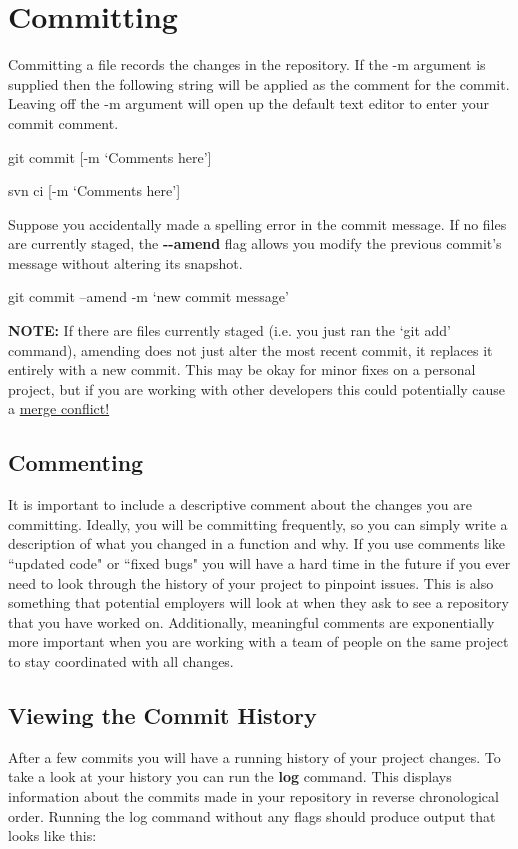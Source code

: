 \documentclass[oneside]{book}
\begin{document}
\newpage
\section{Committing}
Committing a file records the changes in the repository. If the -m argument is supplied then the following string will be applied as the comment for the commit. Leaving off the -m argument will open up the default text editor to enter your commit comment.
    \begin{gitcode}
    git commit [-m `Comments here']
    \end{gitcode}
    \begin{svncode}
    svn ci [-m `Comments here']
    \end{svncode}
    
Suppose you accidentally made a spelling error in the commit message. If no files are currently staged, the \textbf{-{}-amend} flag allows you modify the previous commit's message without altering its snapshot. 

    \begin{gitcode}
    git commit --amend -m `new commit message'
    \end{gitcode}

\textbf{NOTE:} If there are files currently staged (i.e. you just ran the `git add' command), amending does not just alter the most recent commit, it replaces it entirely with a new commit. This may be okay for minor fixes on a personal project, but if you are working with other developers this could potentially cause a \hyperref[sec:conflict-resolution]{merge conflict!}
    
\subsection{Commenting}
It is important to include a descriptive comment about the changes you are committing. Ideally, you will be committing frequently, so you can simply write a description of what you changed in a function and why. If you use comments like ``updated code" or ``fixed bugs" you will have a hard time in the future if you ever need to look through the history of your project to pinpoint issues. This is also something that potential employers will look at when they ask to see a repository that you have worked on. Additionally, meaningful comments are exponentially more important when you are working with a team of people on the same project to stay coordinated with all changes. 

\subsection{Viewing the Commit History}
After a few commits you will have a running history of your project changes. To take a look at your history you can run the \textbf{log} command. This displays information about the commits made in your repository in reverse chronological order. Running the log command without any flags should produce output that looks like this:
\end{document}
